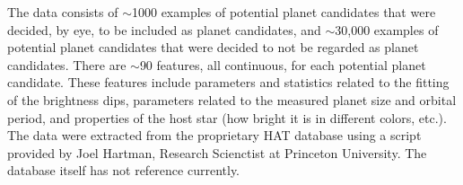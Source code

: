 The data consists of ${\sim}$1000 examples of potential planet candidates that were decided, by eye, to be included as planet candidates, and ${\sim}$30,000 examples of potential planet candidates that were decided to not be regarded as planet candidates.  There are ${\sim}$90 features, all continuous, for each potential planet candidate.  These features include parameters and statistics related to the fitting of the brightness dips, parameters related to the measured planet size and orbital period, and properties of the host star (how bright it is in different colors, etc.).  The data were extracted from the proprietary HAT database using a script provided by Joel Hartman, Research Scienctist at Princeton University.  The database itself has not reference currently.
